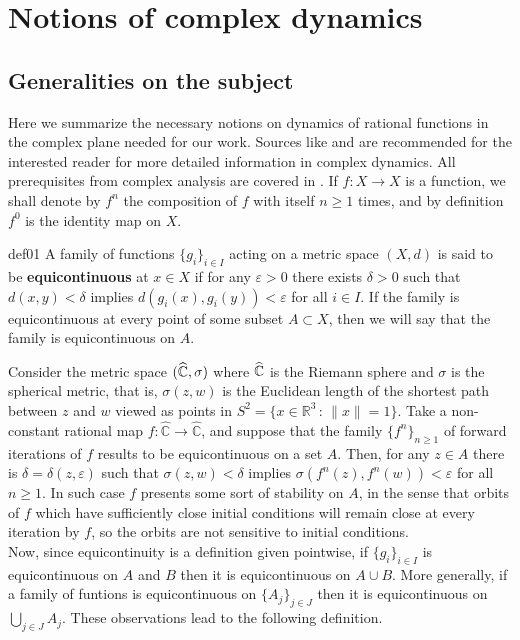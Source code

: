 \section{Notions of complex dynamics}\label{complexdynamics}
\subsection{Generalities on the subject}
Here we summarize the necessary notions on dynamics of rational functions in the complex plane needed for our work. Sources like \cite{beardon} and \cite{milnordynamics} are recommended for the interested reader for more detailed information in complex dynamics. All prerequisites from complex analysis are covered in \cite{ahlfors}. If $f:X \rightarrow X$ is a function, we shall denote by $f^n$ the composition of $f$ with itself $n\geq 1$ times, and by definition $f^0$ is the identity map on $X$.

\begin{mydef}{}{def01}
A family of functions $\{g_i\}_{i\in I}$ acting on a metric space $(X,d)$ is said to be {\bf equicontinuous} at $x \in X$ if for any $\varepsilon>0$ there exists $\delta>0$ such that $d(x,y)<\delta$ implies $d(g_i(x),g_i(y))<\varepsilon$ for all $i \in I$. If the family is equicontinuous at every point of some subset $A\subset X$, then we will say that the family is equicontinuous on $A$.
\end{mydef}

Consider the metric space $(\widehat{\mathbb{C}},\sigma)$ where $\widehat{\mathbb{C}}$ is the Riemann sphere  and $\sigma$ is the spherical metric, that is, $\sigma(z,w)$ is the Euclidean length of the shortest path between $z$ and $w$ viewed as points in $S^2=\{x\in \mathbb{R}^3\,:\, \|x\|=1\}$. Take a non-constant rational map $f:\widehat{\mathbb{C}} \rightarrow \widehat{\mathbb{C}}$, and suppose that the family $\{f^{n}\}_{n\geq 1}$ of forward iterations of $f$ results to be equicontinuous on a set $A$. Then, for any $z\in A$ there is $\delta = \delta(z,\varepsilon)$ such that $\sigma(z,w)<\delta$ implies $\sigma(f^n(z),f^n(w))<\varepsilon$ for all $n\geq 1$. In such case $f$ presents some sort of stability on $A$, in the sense that orbits of $f$ which have sufficiently close initial conditions will remain close at every iteration by $f$, so the orbits are not sensitive to initial conditions.\\

Now, since equicontinuity is a definition given pointwise, if $\{g_i\}_{i\in I}$ is equicontinuous on $A$ and $B$ then it is equicontinuous on $A\cup B$. More generally, if a family of funtions is equicontinuous on $\{A_j\}_{j\in J}$ then it is equicontinuous on $\bigcup_{j\in J} A_j$. These observations lead to the following definition.


